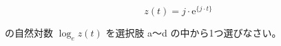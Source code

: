 \[
z(t) = j \cdot \textrm{e}^{ \{j \cdot t \} } 
\]

\bigskip
\noindent の自然対数 $\log_e z(t)$ を選択肢 a〜d の中から1つ選びなさい。 

